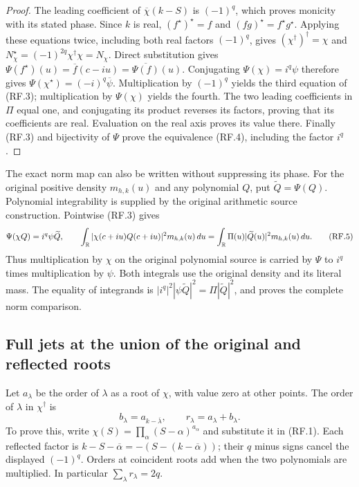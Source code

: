 \begin{proof}
The leading coefficient of $\overline\chi(k-S)$ is $(-1)^q$,
which proves monicity with its stated phase. Since $k$ is real,
$(f^\star)^\star=f$ and $(fg)^\star=f^\star g^\star$.
Applying these equations twice, including both real factors $(-1)^q$,
gives $(\chi^\dagger)^\dagger=\chi$ and
$N_\chi^\star=(-1)^{2q}\chi^\dagger\chi=N_\chi$.
Direct substitution gives
$\Psi(f^\star)(u)=\overline f(c-iu)=\overline{\Psi(f)}(u)$.
Conjugating $\Psi(\chi)=i^q\psi$ therefore gives
$\Psi(\chi^\star)=(-i)^q\overline\psi$.
Multiplication by $(-1)^q$ yields the third equation of (RF.3);
multiplication by $\Psi(\chi)$ yields the fourth. The two leading
coefficients in $\Pi$ equal one, and conjugating its product reverses
its factors, proving that its coefficients are real. Evaluation on
the real axis proves its value there. Finally (RF.3) and bijectivity
of $\Psi$ prove the equivalence (RF.4), including the factor $i^q$.
\end{proof}

The exact norm map can also be written without suppressing its phase.
For the original positive density $m_{h,k}(u)$ and any polynomial $Q$,
put $\widetilde Q=\Psi(Q)$. Polynomial integrability is supplied by the
original arithmetic source construction. Pointwise (RF.3) gives
\[
 \Psi(\chi Q)=i^q\psi\widetilde Q,
 \qquad
 \int_\mathbb R|\chi(c+iu)Q(c+iu)|^2m_{h,k}(u)\,du
 =\int_\mathbb R\Pi(u)|\widetilde Q(u)|^2m_{h,k}(u)\,du.
 \tag{RF.5}
\]
Thus multiplication by $\chi$ on the original polynomial source is
carried by $\Psi$ to $i^q$ times multiplication by $\psi$. Both
integrals use the original density and its literal mass. The equality
of integrands is $|i^q|^2|\psi\widetilde Q|^2
=\Pi|\widetilde Q|^2$, and proves the complete norm comparison.

\subsection{Full jets at the union of the original and reflected roots}

Let $a_\lambda$ be the order of $\lambda$ as a root of $\chi$, with
value zero at other points. The order of $\lambda$ in $\chi^\dagger$
is
\[
 b_\lambda=a_{k-\overline\lambda},\qquad
 r_\lambda=a_\lambda+b_\lambda.
 \tag{RF.6}
\]
To prove this, write $\chi(S)=\prod_\alpha(S-\alpha)^{a_\alpha}$
and substitute it in (RF.1). Each reflected factor is
$k-S-\overline\alpha=-(S-(k-\overline\alpha))$;
their $q$ minus signs cancel the displayed $(-1)^q$. Orders at
coincident roots add when the two polynomials are multiplied.
In particular $\sum_\lambda r_\lambda=2q$.

